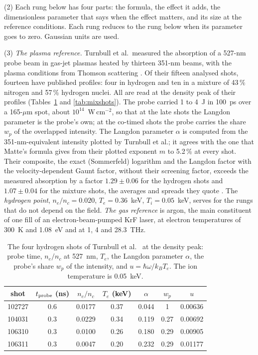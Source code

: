 \documentclass[11pt]{article}
\numberwithin{equation}{section}
\newcommand{\kB}{k_B}
\begin{document}
{\noindent}(2) Each rung below has four parts: the formula, the effect it adds,
the dimensionless parameter that says when the effect matters, and its size at the
reference conditions. Each rung reduces to the rung below when its parameter goes
to zero. Gaussian units are used.

{\noindent}(3) \emph{The plasma reference.} Turnbull et al.\ measured the absorption
of a 527-nm probe beam in gas-jet plasmas heated by thirteen 351-nm beams, with the plasma
conditions from Thomson scattering \cite{Turnbull2023,Turnbull2024}. Of their fifteen analysed
shots, fourteen have published profiles: four in hydrogen and ten in a mixture of 43\,\% nitrogen
and 57\,\% hydrogen nuclei. All are read at the density peak of their profiles
(Tables~\ref{tab:shots} and \ref{tab:mixshots}). The probe carried 1 to 4~J in 100~ps over a
165-$\mu$m spot, about $10^{14}$~W\,cm$^{-2}$, so that at the late shots the Langdon parameter is
the probe's own; at the co-timed shots the probe carries the share $w_p$ of the overlapped
intensity. The Langdon parameter $\alpha$ is computed from the 351-nm-equivalent intensity
plotted by Turnbull et al.; it agrees with the one that Matte's formula gives from their plotted
exponent $m$ to 5.2\,\% at every shot. Their composite, the exact (Sommerfeld) logarithm and
the Langdon factor with the velocity-dependent Gaunt factor, without their screening factor,
exceeds the measured absorption by a factor $1.29\pm0.06$ for the hydrogen shots and
$1.07\pm0.04$ for the mixture shots, the averages and spreads they quote \cite{Turnbull2024}. The
\emph{hydrogen point}, $n_e/n_c=0.020$, $T_e=0.36$~keV, $T_i=0.05$~keV, serves for the rungs that
do not depend on the field. \emph{The gas reference} is argon, the main constituent of one fill
of an electron-beam-pumped KrF laser, at electron temperatures of 300~K and 1.08~eV and at 1, 4
and 28.3~THz.

\begin{table}[ht]
\caption{The four hydrogen shots of Turnbull et al.\ \cite{Turnbull2024} at the density
peak: probe time, $n_e/n_c$ at 527~nm, $T_e$, the Langdon parameter $\alpha$, the probe's share
$w_p$ of the intensity, and $u=\hbar\omega/\kB T_e$. The ion temperature is 0.05~keV.}
\label{tab:shots}
\begin{center}
\begin{tabular}{ccccccc}
\toprule
shot & $t_{\rm probe}$ (ns) & $n_e/n_c$ & $T_e$ (keV) & $\alpha$ & $w_p$ & $u$\\
\midrule
102727 & 0.6 & 0.0177 & 0.37 & 0.044 & 1 & 0.00636\\
104031 & 0.3 & 0.0229 & 0.34 & 0.119 & 0.27 & 0.00692\\
106310 & 0.3 & 0.0100 & 0.26 & 0.180 & 0.29 & 0.00905\\
106311 & 0.3 & 0.0047 & 0.20 & 0.232 & 0.29 & 0.01177\\
\bottomrule
\end{tabular}
\end{center}
\end{table}
\end{document}
